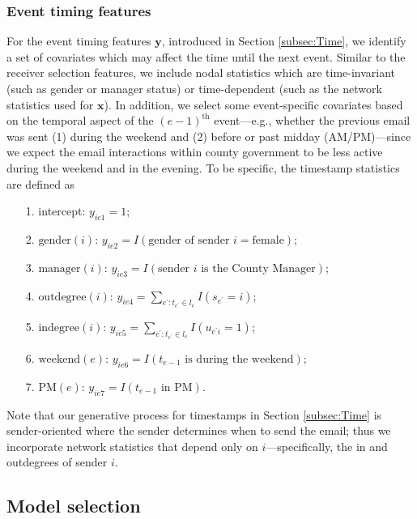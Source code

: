 \documentclass[ba]{imsart}
\numberwithin{equation}{section}
\theoremstyle{plain}
\begin{document}
	\subsubsection{Event timing features}
For the event timing features $\boldsymbol{y}$, introduced in Section \ref{subsec:Time}, we identify a set of covariates which may affect the time until the next event. Similar to the receiver selection features, we include nodal statistics which are time-invariant (such as gender or manager status) or time-dependent (such as the network statistics used for $\boldsymbol{x}$). In addition, we select some event-specific covariates based on the temporal aspect of the $(e-1)^{\textrm{th}}$ event---e.g., whether the previous email was sent (1) during the weekend and (2) before or past midday (AM/PM)---since we expect the email interactions within county government to be less active during the weekend and in the evening. To be specific, the timestamp statistics are defined as
	\begin{itemize}
		\item[1.] intercept: ${y}_{ie1} =1$;
		\item[2.] $\mbox{gender}(i)$: ${y}_{ie2}=I(\mbox{gender of sender }i= \mbox{female})$;
		\item[3.] $\mbox{manager}(i)$: ${y}_{ie3}=I(\mbox{sender }i \mbox{ is the County Manager})$;
		\item[4.] $\mbox{outdegree}(i)$: ${y}_{ie4} =\sum_{e^\prime: t_{e^\prime} \in l_e} I(s_{e^\prime} = i)$;
		\item[5.] $\mbox{indegree}(i)$: ${y}_{ie5}=\sum_{e^\prime: t_{e^\prime} \in l_e} I(u_{e^\prime i} = 1)$;
		\item[6.] $\mbox{weekend}(e)$: ${y}_{ie6} = I(t_{e-1} \mbox{ is during the } \mbox{weekend})$;
		\item[7.] $\mbox{PM}(e)$: ${y}_{ie7}= I(t_{e-1} \mbox{ in } \mbox{PM})$.
	\end{itemize}
	Note that our generative process for timestamps in Section \ref{subsec:Time} is sender-oriented where the sender determines when to send the email; thus we incorporate network statistics that depend only on $i$---specifically, the in and outdegrees of sender $i$. 
	
	\subsection{Model selection}\label{subsec:Experiment_email}
	
\end{document}
